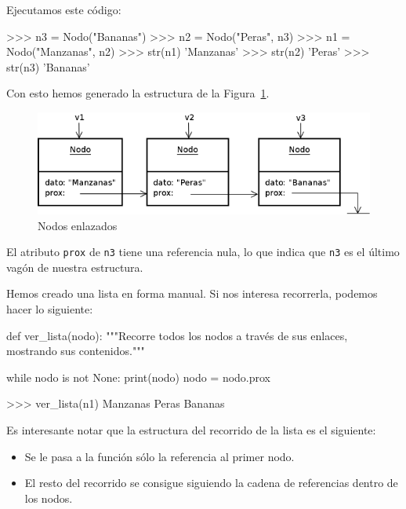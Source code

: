 Ejecutamos este código:

\begin{codigo-python-sn}
>>> n3 = Nodo("Bananas")
>>> n2 = Nodo("Peras", n3)
>>> n1 = Nodo("Manzanas", n2)
>>> str(n1)
'Manzanas'
>>> str(n2)
'Peras'
>>> str(n3)
'Bananas'
\end{codigo-python-sn}

Con esto hemos generado la estructura de la Figura~\ref{nodos}.

\begin{figure}[htb]
\includegraphics{graficos/16_Nodos}
\caption{Nodos enlazados}
\label{nodos}
\end{figure}

El atributo \lstinline!prox! de \lstinline!n3! tiene una referencia nula,
lo que indica que \lstinline!n3! es el último vagón de nuestra estructura.

Hemos creado una lista en forma manual. Si nos interesa recorrerla, podemos
hacer lo siguiente:

\begin{codigo-python-sn}
def ver_lista(nodo):
    """Recorre todos los nodos a través de sus enlaces,
       mostrando sus contenidos."""

    while nodo is not None:
        print(nodo)
        nodo = nodo.prox
\end{codigo-python-sn}

\begin{codigo-python-sn}
>>> ver_lista(n1)
Manzanas
Peras
Bananas
\end{codigo-python-sn}

Es interesante notar que la estructura del recorrido de la lista es el
siguiente:

\begin{itemize}
\item Se le pasa a la función sólo la referencia al primer nodo.

\item El resto del recorrido se consigue siguiendo la cadena de
referencias dentro de los nodos.
\end{itemize}

